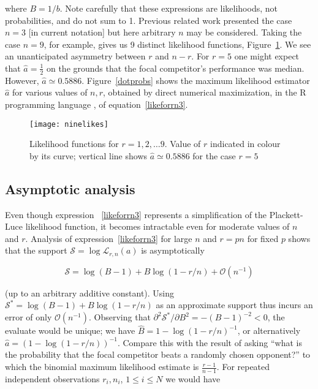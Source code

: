 \documentclass[article]{ajs}
\begin{document}
\noindent where $B=1/b$.  Note carefully that these expressions are
likelihoods, not probabilities, and do not sum to 1.  Previous related
work \citep{hankin2024_hyper3} presented the case $n=3$ [in current
  notation] but here arbitrary $n$ may be considered.  Taking the case
$n=9$, for example, gives us 9 distinct likelihood functions,
Figure~\ref{ninelikes}.  We see an unanticipated asymmetry between $r$
and $n-r$.  For $r=5$ one might expect that $\hat{a}=\frac{1}{2}$ on
the grounds that the focal competitor's performance was median.
However, $\hat{a}\simeq 0.5886$.  Figure~\ref{dotprobs} shows the
maximum likelihood estimator $\hat{a}$ for various values of $n,r$,
obtained by direct numerical maximization, in the R programming
language \cite{rcore2024}, of equation~\ref{likeforrn3}.

\begin{figure}[t]
  \begin{centering}
\texttt{[image: ninelikes]}  %
\caption{Likelihood functions for $r=1,2,\ldots 9$\label{ninelikes}.  Value
  of $r$ indicated in colour by its curve; vertical line shows
  $\hat{a}\simeq 0.5886$ for the case $r=5$}
\end{centering}
\end{figure}


\subsection{Asymptotic analysis}

Even though expression ~\ref{likeforrn3} represents a simplification
of the Plackett-Luce likelihood function, it becomes intractable even
for moderate values of $n$ and $r$.  Analysis of
expression~\ref{likeforrn3} for large $n$ and $r=pn$ for fixed $p$
shows that the support $\mathcal{S}=\log\mathcal{L}_{r,n}(a)$ is
asymptotically

\begin{equation}\label{asymptotic}
\mathcal{S}=
\log(B-1) + B\log(1-r/n)
+\mathcal{O}\left(n^{-1}\right)
\end{equation}

(up to an arbitrary additive constant).  Using
$\mathcal{S}^*=\log(B-1)+B\log(1-r/n)$ as an approximate support thus
incurs an error of only $\mathcal{O}(n^{-1})$.  Observing that
$\partial^2\mathcal{S}^*/\partial B^2=-(B-1)^{-2}<0$, the evaluate
would be unique; we have $\hat{B}=1-\log(1-r/n)^{-1}$, or
alternatively $\hat{a}=(1-\log(1-r/n))^{-1}$.  Compare this with the
result of asking ``what is the probability that the focal competitor
beats a randomly chosen opponent?'' to which the binomial maximum
likelihood estimate is $\frac{r-1}{n-1}$.  For repeated independent
observations $r_i,n_i$, $1\leqslant i\leqslant N$ we would have
\end{document}
